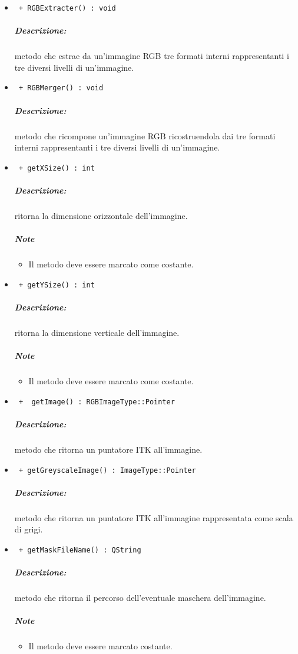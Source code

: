 \begin{itemize}
		\item \color{blue}\verb! + RGBExtracter() : void! 
		\color{black}
		\subparagraph{Descrizione:} metodo che estrae da un'immagine RGB tre formati interni rappresentanti i tre diversi livelli di un'immagine.
		
		\item \color{blue}\verb! + RGBMerger() : void! 
		\color{black}
		\subparagraph{Descrizione:} metodo che ricompone un'immagine RGB ricostruendola dai tre formati interni rappresentanti i tre diversi livelli di un'immagine.
		
	\item \color{blue}\verb! + getXSize() : int !\\
	\color{black}
	\subparagraph{Descrizione: } ritorna la dimensione orizzontale dell'immagine.
	\subparagraph{Note}
		\begin{itemize}
			\item Il metodo deve essere marcato come costante.
		\end{itemize}
		
	\item \color{blue}\verb! + getYSize() : int !\\
	\color{black}
	\subparagraph{Descrizione: } ritorna la dimensione verticale dell'immagine.
	\subparagraph{Note}
		\begin{itemize}
			\item Il metodo deve essere marcato come costante.
		\end{itemize}
		
	\item \color{blue}\verb! +  getImage() : RGBImageType::Pointer!\\
	\color{black}
	\subparagraph{Descrizione:} metodo che ritorna un puntatore ITK\g{} all'immagine.
	
	\item \color{blue}\verb! + getGreyscaleImage() : ImageType::Pointer!\\
	\color{black}
	\subparagraph{Descrizione:} metodo che ritorna un puntatore ITK\g{} all'immagine rappresentata come scala di grigi.
	
	\item \color{blue}\verb! + getMaskFileName() : QString!\\
	\color{black}
	\subparagraph{Descrizione:} metodo che ritorna il percorso dell'eventuale maschera\g{} dell'immagine.
	\subparagraph{Note}
		\begin{itemize}
			\item Il metodo deve essere marcato costante.
		\end{itemize}
		

\end{itemize}
